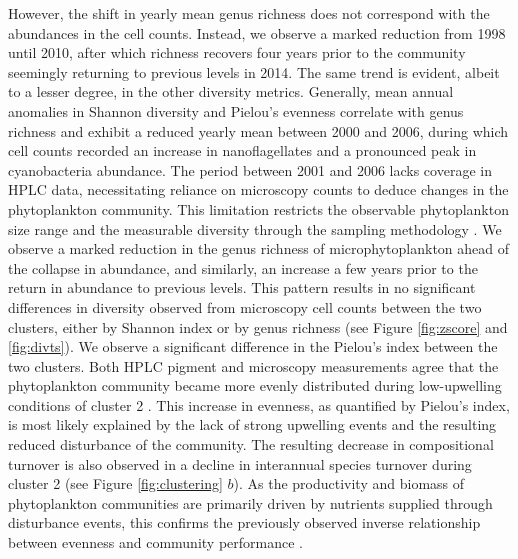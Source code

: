 \documentclass[draft]{agujournal2019}
\begin{document}
However, the shift in yearly mean genus richness does not correspond with the abundances in the cell counts. Instead, we observe a marked reduction from 1998 until 2010, after which richness recovers four years prior to the community seemingly returning to previous levels in 2014. The same trend is evident, albeit to a lesser degree, in the other diversity metrics. Generally, mean annual anomalies in Shannon diversity and Pielou's evenness correlate with genus richness and exhibit a reduced yearly mean between 2000 and 2006, during which cell counts recorded an increase in nanoflagellates and a pronounced peak in cyanobacteria abundance.
The period between 2001 and 2006 lacks coverage in HPLC data, necessitating reliance on microscopy counts to deduce changes in the phytoplankton community. This limitation restricts the observable phytoplankton size range and the measurable diversity through the sampling methodology \cite{cermeno_sampling_2014}. We observe a marked reduction in the genus richness of microphytoplankton ahead of the collapse in abundance, and similarly, an increase a few years prior to the return in abundance to previous levels. This pattern results in no significant differences in diversity observed from microscopy cell counts between the two clusters, either by Shannon index or by genus richness (see Figure \ref{fig:zscore} and \ref{fig:divts}).
We observe a significant difference in the Pielou's index between the two clusters. Both HPLC pigment and microscopy measurements agree that the phytoplankton community became more evenly distributed during low-upwelling conditions of cluster 2 \cite{pinckney_phytoplankton_2015}. This increase in evenness, as quantified by Pielou's index, is most likely explained by the lack of strong upwelling events and the resulting reduced disturbance of the community. The resulting decrease in compositional turnover is also observed in a decline in interannual species turnover during cluster 2 (see Figure \ref{fig:clustering} $b$). As the productivity and biomass of phytoplankton communities are primarily driven by nutrients supplied through disturbance events, this confirms the previously observed inverse relationship between evenness and community performance \cite{lehtinen_phytoplankton_2017, otero_phytoplankton_2020}.
\end{document}
